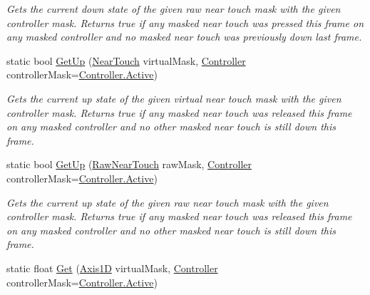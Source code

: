 \begin{DoxyCompactItemize}
\begin{DoxyCompactList}\small\item\em Gets the current down state of the given raw near touch mask with the given controller mask. Returns true if any masked near touch was pressed this frame on any masked controller and no masked near touch was previously down last frame. \end{DoxyCompactList}\item 
static bool \mbox{\hyperlink{class_o_v_r_input_a68539258d6e7216281b8f85722ac10b3}{Get\+Up}} (\mbox{\hyperlink{class_o_v_r_input_afa31aa573064be9bab8fc9e58cddeab6}{Near\+Touch}} virtual\+Mask, \mbox{\hyperlink{class_o_v_r_input_a5c86f9052a9cbb0b73779ff5704d60a8}{Controller}} controller\+Mask=\mbox{\hyperlink{class_o_v_r_input_a5c86f9052a9cbb0b73779ff5704d60a8a4d3d769b812b6faa6b76e1a8abaece2d}{Controller.\+Active}})
\begin{DoxyCompactList}\small\item\em Gets the current up state of the given virtual near touch mask with the given controller mask. Returns true if any masked near touch was released this frame on any masked controller and no other masked near touch is still down this frame. \end{DoxyCompactList}\item 
static bool \mbox{\hyperlink{class_o_v_r_input_a183c4e73f60720968a86fae467e9fc4f}{Get\+Up}} (\mbox{\hyperlink{class_o_v_r_input_ac9c3c10aa9911507c6dc66e2dd6ec60e}{Raw\+Near\+Touch}} raw\+Mask, \mbox{\hyperlink{class_o_v_r_input_a5c86f9052a9cbb0b73779ff5704d60a8}{Controller}} controller\+Mask=\mbox{\hyperlink{class_o_v_r_input_a5c86f9052a9cbb0b73779ff5704d60a8a4d3d769b812b6faa6b76e1a8abaece2d}{Controller.\+Active}})
\begin{DoxyCompactList}\small\item\em Gets the current up state of the given raw near touch mask with the given controller mask. Returns true if any masked near touch was released this frame on any masked controller and no other masked near touch is still down this frame. \end{DoxyCompactList}\item 
static float \mbox{\hyperlink{class_o_v_r_input_a32afd2d0bf3c8fa6332f685745de380a}{Get}} (\mbox{\hyperlink{class_o_v_r_input_af5c3e63489ca9ee2e5db3a657f7f27f6}{Axis1D}} virtual\+Mask, \mbox{\hyperlink{class_o_v_r_input_a5c86f9052a9cbb0b73779ff5704d60a8}{Controller}} controller\+Mask=\mbox{\hyperlink{class_o_v_r_input_a5c86f9052a9cbb0b73779ff5704d60a8a4d3d769b812b6faa6b76e1a8abaece2d}{Controller.\+Active}})

\end{DoxyCompactItemize}
